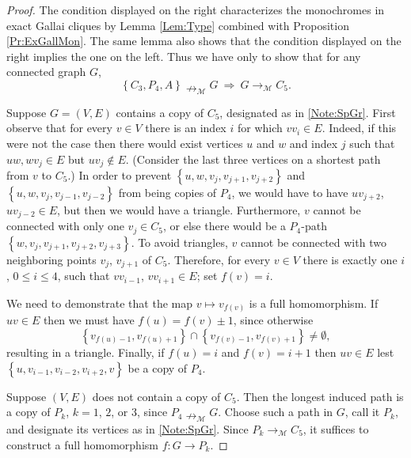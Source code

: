 \documentclass[12pt]{amsart}
\theoremstyle{plain}
\numberwithin{equation}{section}
\begin{document}
\begin{proof}
The condition displayed on the right characterizes the mo\-no\-chrom\-es in exact
Gallai cliques by Lemma \ref{Lem:Type} combined with Proposition
\ref{Pr:ExGallMon}. The same lemma also shows that the condition displayed on
the right implies the one on the left. Thus we have only to show that for any
connected graph $G$,
\begin{displaymath}
    \left\{  C_{3},P_{4},A\right\}  \nrightarrow_{\mathcal{M}}G\ \Rightarrow
    \ G\rightarrow_{\mathcal{M}}C_{5}.
\end{displaymath}


Suppose $G=(V,E)$ contains a copy of $C_{5}$, designated as in \ref{Note:SpGr}.
First observe that for every $v\in V$ there is an index $i$ for which
$vv_{i}\in E$. Indeed, if this were not the case then there would exist
vertices $u$ and $w$ and index $j$ such that $uw,wv_{j}\in E$ but $uv_{j}\notin
E$. (Consider the last three vertices on a shortest path from $v$ to $C_{5}$.)
In order to prevent $\left\{  u,w,v_{j},v_{j+1},v_{j+2}\right\}  $ and $\left\{
u,w,v_{j},v_{j-1},v_{j-2}\right\}  $ from being copies of $P_{4}$, we would
have to have $uv_{j+2}$, $uv_{j-2}\in E$, but then we would have a triangle.
Furthermore, $v$ cannot be connected with only one $v_{j}\in C_{5}$, or else
there would be a $P_{4}$-path $\left\{ w,v_{j},v_{j+1},v_{j+2},v_{j+3}\right\}
$. To avoid triangles, $v$ cannot be connected with two neighboring points
$v_{j}$, $v_{j+1}$ of $C_{5}$. Therefore, for every $v\in V$ there is exactly
one $i$, $0\leq i\leq 4$, such that $vv_{i-1}$, $vv_{i+1}\in E$; set $f(v)=i$.

We need to demonstrate that the map $v\longmapsto v_{f\left( v\right)  }$ is a
full homomorphism. If $uv\in E$ then we must have $f(u)=f(v)\pm1$, since
otherwise
\begin{displaymath}
    \left\{  v_{f(u)-1},v_{f(u)+1}\right\}  \cap\left\{  v_{f(v)-1},v_{f(v)+1}
    \right\}  \neq\emptyset,
\end{displaymath}
resulting in a triangle. Finally, if $f(u)=i$ and $f(v)=i+1$ then $uv\in E$
lest $\left\{  u,v_{i-1},v_{i-2},v_{i+2},v\right\}  $ be a copy of $P_{4}$.

Suppose $(V,E)$ does not contain a copy of $C_{5}$. Then the longest induced
path is a copy of $P_{k}$, $k=1$, $2$, or $3$, since
$P_{4}\nrightarrow_{\mathcal{M}}G$. Choose such a path in $G$, call it $P_{k}$,
and designate its vertices as in \ref{Note:SpGr}. Since
$P_{k}\rightarrow_{\mathcal{M}}C_{5}$, it suffices to construct a full
homomorphism $f:G\rightarrow P_{k}$.


\end{proof}
\end{document}
